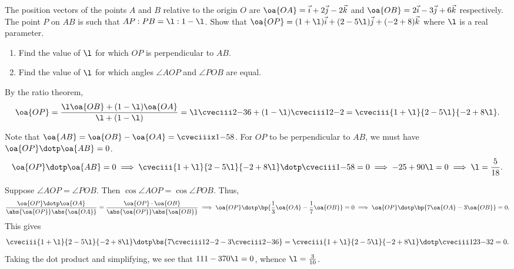 \begin{problem}
    The position vectors of the points $A$ and $B$ relative to the origin $O$ are $\oa{OA} = \vec i + 2 \vec j - 2 \vec k$ and $\oa{OB} = 2\vec i - 3 \vec j + 6 \vec k$ respectively. The point $P$ on $AB$ is such that $AP:PB = \l:1-\l$. Show that $\oa{OP} = (1 + \l)\vec i + (2 - 5\l)\vec j + (-2 + 8) \vec k$ where $\l$ is a real parameter.

    \begin{enumerate}
        \item Find the value of $\l$ for which $OP$ is perpendicular to $AB$.
        \item Find the value of $\l$ for which angles $\angle AOP$ and $\angle POB$ are equal.
    \end{enumerate}
\end{problem}
\begin{solution}
    By the ratio theorem, \[\oa{OP} = \frac{\l \oa{OB} + (1-\l) \oa{OA}}{\l + (1 - \l)} = \l \cveciii2{-3}6 + (1-\l)\cveciii12{-2} = \cveciii{1+\l}{2-5\l}{-2+8\l}.\]

    \begin{ppart}
        Note that $\oa{AB} = \oa{OB} - \oa{OA} = \cveciiix1{-5}8$. For $OP$ to be perpendicular to $AB$, we must have $\oa{OP} \dotp \oa{AB} = 0$. \[\oa{OP} \dotp \oa{AB} = 0 \implies \cveciii{1+\l}{2-5\l}{-2+8\l} \dotp \cveciii1{-5}8 = 0 \implies -25 + 90\l = 0 \implies \l = \frac5{18}.\]
    \end{ppart}
    \begin{ppart}
        Suppose $\angle AOP = \angle POB$. Then $\cos \angle AOP = \cos \angle POB$. Thus, \[\frac{\oa{OP} \dotp \oa{OA}}{\abs{\oa{OP}} \abs{\oa{OA}}} = \frac{\oa{OP} \cdot \oa{OB}}{\abs{\oa{OP}} \abs{\oa{OB}}} \implies \oa{OP} \dotp \bp{\frac13 \oa{OA} - \frac17 \oa{OB}} = 0 \implies \oa{OP} \dotp \bp{7\oa{OA} - 3\oa{OB}} = 0.\] This gives \[\cveciii{1+\l}{2-5\l}{-2+8\l} \dotp \bs{7 \cveciii12{-2} -  3 \cveciii2{-3}6} = \cveciii{1+\l}{2-5\l}{-2+8\l} \dotp \cveciii1{23}{-32} = 0.\] Taking the dot product and simplifying, we see that $111 - 370\l = 0$, whence $\l = \frac3{10}$.
    \end{ppart}
\end{solution}

